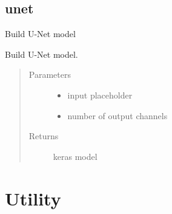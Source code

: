 \documentclass[letterpaper,10pt,english]{sphinxmanual}
\begin{document}
\section{unet}
\label{\detokenize{index:module-unet.unet}}\label{\detokenize{index:unet}}
Build U-Net model

\begin{fulllineitems}
\label{\detokenize{index:unet.unet.unet_model}}
Build U-Net model.
\begin{quote}\begin{description}
\item[{Parameters}] \leavevmode\begin{itemize}
\item {} 
 \textendash{} input placeholder

\item {} 
 \textendash{} number of output channels

\end{itemize}

\item[{Returns}] \leavevmode
keras model

\end{description}\end{quote}

\end{fulllineitems}



\chapter{Utility}
\label{\detokenize{index:utility}}
\end{document}
